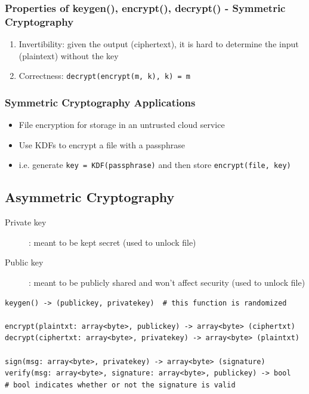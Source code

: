 \documentclass[letterpaper,12pt]{article}
\begin{document}
\subsubsection{Properties of keygen(), encrypt(), decrypt() - Symmetric Cryptography}
\begin{enumerate}
 \item Invertibility: given the output (ciphertext), it is hard to determine the input (plaintext) without the key
 \item Correctness: \lstinline{decrypt(encrypt(m, k), k) = m}
\end{enumerate}

\subsubsection{Symmetric Cryptography Applications}
\begin{itemize}
 \item File encryption for storage in an untrusted cloud service
 \item Use KDFs to encrypt a file with a passphrase
 \item i.e. generate \lstinline{key = KDF(passphrase)} and then store \lstinline{encrypt(file, key)}
\end{itemize}

\subsection{Asymmetric Cryptography}
\begin{description}
 \item[Private key]: meant to be kept secret (used to unlock file)
 \item[Public key]: meant to be publicly shared and won't affect security (used to unlock file)
\end{description}

\begin{lstlisting}
keygen() -> (publickey, privatekey)  # this function is randomized

encrypt(plaintxt: array<byte>, publickey) -> array<byte> (ciphertxt)
decrypt(ciphertxt: array<byte>, privatekey) -> array<byte> (plaintxt)

sign(msg: array<byte>, privatekey) -> array<byte> (signature)
verify(msg: array<byte>, signature: array<byte>, publickey) -> bool
# bool indicates whether or not the signature is valid
\end{lstlisting}
\end{document}
